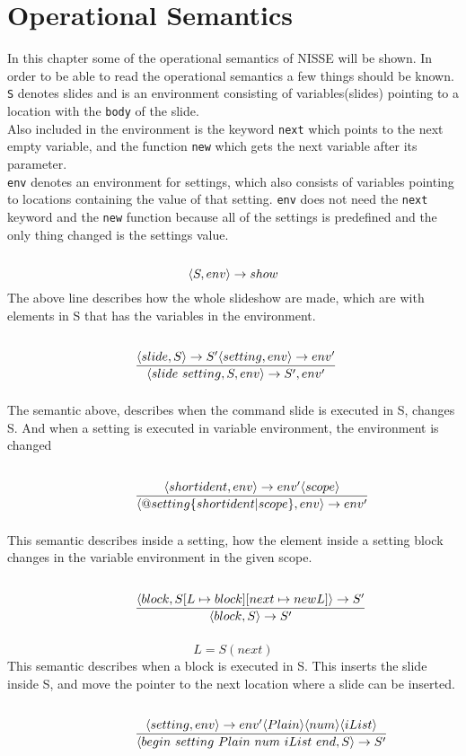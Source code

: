 \chapter{Operational Semantics}
In this chapter some of the operational semantics of NISSE will be shown. In order to be able to read the operational semantics a few things should be known. \\
\texttt{S} denotes slides and is an environment consisting of variables(slides) pointing to a location with the \texttt{body} of the slide. \\
Also included in the environment is the keyword \texttt{next} which points to the next empty variable, and the function \texttt{new} which gets the next variable after its parameter. \\
\texttt{env} denotes an environment for settings, which also consists of variables pointing to locations containing the value of that setting. \texttt{env} does not need the \texttt{next} keyword and the \texttt{new} function because all of the settings is predefined and the only thing changed is the settings value.\\ \\
\noindent{$[slideshow]$}
\[ \langle S, env \rangle \rightarrow show \]
The above line describes how the whole slideshow are made, which are with elements in S that has the variables in the environment.

\noindent{$[specification]$}
\[ \condinfrule{\langle slide, S \rangle \ra S'       \langle setting, env \rangle \ra env'} { \langle slide~setting, S, env \rangle \ra S', env'}{} \]
The semantic above, describes when the command slide is executed in S, changes S. And when a setting is executed in variable environment, the environment is changed

\noindent{$[setting]$}
\[ \condinfrule{\langle shortident, env \rangle \ra env' \langle scope \rangle} { \langle @ setting \{ shortident | scope \}, env \rangle \ra env'}{} \]
This semantic describes inside a setting, how the element inside a setting block changes in the variable environment in the given scope.

\noindent{$[slide]$}
\[ \condinfrule{\langle block, S[L \mapsto block] [next \mapsto new L] \rangle \ra S'} { \langle block, S \rangle \ra S'}{} \]
\[ L = S(next)\]
This semantic describes when a block is executed in S. This inserts the slide inside S, and move the pointer to the next location where a slide can be inserted.

\noindent{$[block]$}
\[ \condinfrule{\langle setting, env \rangle \ra env' \langle Plain \rangle \langle num \rangle \langle iList \rangle} { \langle begin~setting~Plain~num~iList~end, S \rangle \ra S'}{} \]


